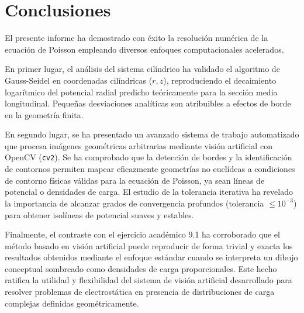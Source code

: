 \section{Conclusiones}

El presente informe ha demostrado con éxito la resolución numérica de la ecuación de Poisson empleando diversos enfoques computacionales acelerados.

En primer lugar, el análisis del sistema cilíndrico ha validado el algoritmo de Gauss-Seidel en coordenadas cilíndricas ($r, z$), reproduciendo el decaimiento logarítmico del potencial radial predicho teóricamente para la sección media longitudinal. Pequeñas desviaciones analíticas son atribuibles a efectos de borde en la geometría finita.

En segundo lugar, se ha presentado un avanzado sistema de trabajo automatizado que procesa imágenes geométricas arbitrarias mediante visión artificial con OpenCV (\texttt{cv2}). Se ha comprobado que la detección de bordes y la identificación de contornos permiten mapear eficazmente geometrías no euclídeas a condiciones de contorno físicas válidas para la ecuación de Poisson, ya sean líneas de potencial o densidades de carga. El estudio de la tolerancia iterativa ha revelado la importancia de alcanzar grados de convergencia profundos (tolerancia $\leq 10^{-3}$) para obtener isolíneas de potencial suaves y estables.

Finalmente, el contraste con el ejercicio académico 9.1 ha corroborado que el método basado en visión artificial puede reproducir de forma trivial y exacta los resultados obtenidos mediante el enfoque estándar cuando se interpreta un dibujo conceptual sombreado como densidades de carga proporcionales. Este hecho ratifica la utilidad y flexibilidad del sistema de visión artificial desarrollado para resolver problemas de electrostática en presencia de distribuciones de carga complejas definidas geométricamente.

